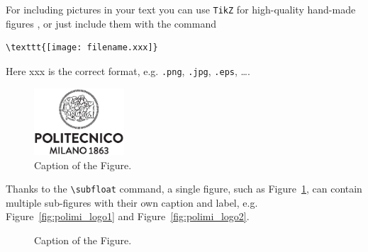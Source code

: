 \documentclass[11pt,a4paper]{article}
\begin{document}
For including pictures in your text you can use \texttt{TikZ} for high-quality hand-made figures \cite{tikz},
or just include them with the command
\begin{verbatim}
\texttt{[image: filename.xxx]}
\end{verbatim}
Here xxx is the correct format, e.g.  \verb|.png|, \verb|.jpg|, \verb|.eps|, \dots.

\begin{figure}[H]
    \centering
    \includegraphics[width=0.3\textwidth]{logo_polimi_scritta.eps}
    \caption{Caption of the Figure.}
    \label{fig:quadtree}
\end{figure}

Thanks to the \texttt{\textbackslash subfloat} command, a single figure, such as Figure~\ref{fig:quadtree},
can contain multiple sub-figures with their own caption and label, e.g. Figure~\ref{fig:polimi_logo1} and Figure~\ref{fig:polimi_logo2}. 

\begin{figure}[H]
    \centering
    \quad
    \caption[]{Caption of the Figure.}
    \label{fig:quadtree2}
\end{figure}
\end{document}
